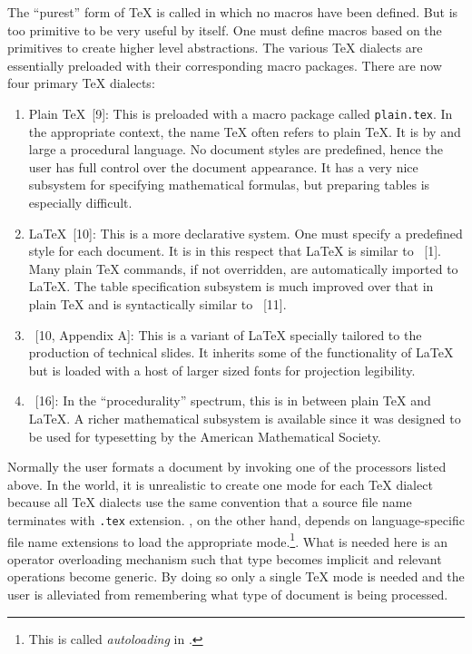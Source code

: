 The ``purest'' form of {\TeX} is called {\initex} in which no macros
have been defined.
But {\initex} is too primitive to be very useful by itself.  One must define
macros based on the {\initex} primitives to create higher level abstractions.
The various {\TeX} dialects are essentially {\initex} preloaded
with their corresponding macro packages.
There are now four primary {\TeX} dialects:
\begin{enumerate}
  \item Plain {\TeX}~[9]:
	This is {\initex} preloaded with a macro package called
	{\tt plain.tex}.  In the appropriate context, the name {\TeX} often
	refers to plain {\TeX}.  It is by and large a procedural language.
	No document styles are predefined, hence the user has full control over
	the document appearance.  It has a very nice subsystem for specifying
	mathematical formulas, but preparing tables is especially difficult.
  \item {\LaTeX}~[10]:
	This is a more declarative system.  One must specify a predefined
	style for each document.  It is in this respect that {\LaTeX} is
	similar to {\scribe}~[1].
	Many plain {\TeX} commands, if not overridden, are
	automatically imported to {\LaTeX}.
	The table specification subsystem is much improved over that in
	plain {\TeX} and is syntactically similar to {\tbl}~[11].
  \item {\SliTeX}~[10, Appendix A]:
	This is a variant of {\LaTeX} specially tailored to the production of
	technical slides.  It inherits some of the functionality of {\LaTeX}
	but is loaded with a host of larger sized fonts for
	projection legibility.
  \item {\AmSTeX}~[16]:
	In the ``procedurality'' spectrum, this is in between plain {\TeX}
	and {\LaTeX}.  A richer mathematical subsystem is available since it
	was designed to be used for typesetting by the American Mathematical
	Society.
\end{enumerate}
Normally the user formats a document by invoking one of the processors
listed above.  In the {\emacs} world, it is unrealistic to create one mode
for each {\TeX} dialect because all {\TeX} dialects use
the same convention that a source file name terminates with \verb|.tex|
extension.  {\emacs}, on the other hand, depends on language-specific
file name extensions to load the appropriate mode.\footnote{This is called
{\it autoloading\/} in {\emacs}.}.
What is needed here is an operator overloading
mechanism such that type becomes implicit and relevant operations
become generic.  By doing so only a single {\TeX} mode is needed and
the user is alleviated from remembering what type of document
is being processed.


